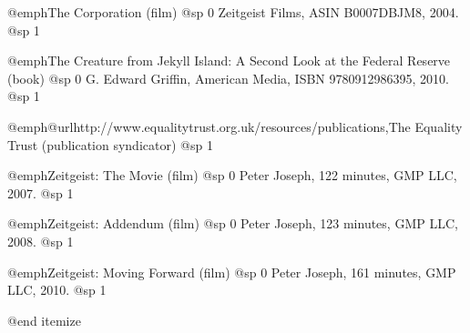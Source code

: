 \item
@emph{The Corporation} (film)
@sp 0
Zeitgeist Films, ASIN B0007DBJM8, 2004.
@sp 1

\item
@emph{The Creature from Jekyll Island: A Second Look at the Federal Reserve} (book)
@sp 0
G. Edward Griffin, American Media, ISBN 9780912986395, 2010.
@sp 1

\item
@emph{@url{http://www.equalitytrust.org.uk/resources/publications,The Equality Trust}} (publication syndicator)
@sp 1

\item
@emph{Zeitgeist: The Movie} (film)
@sp 0
Peter Joseph, 122 minutes, GMP LLC, 2007.
@sp 1

\item
@emph{Zeitgeist: Addendum} (film)
@sp 0
Peter Joseph, 123 minutes, GMP LLC, 2008.
@sp 1

\item
@emph{Zeitgeist: Moving Forward} (film)
@sp 0
Peter Joseph, 161 minutes, GMP LLC, 2010.
@sp 1

@end itemize

